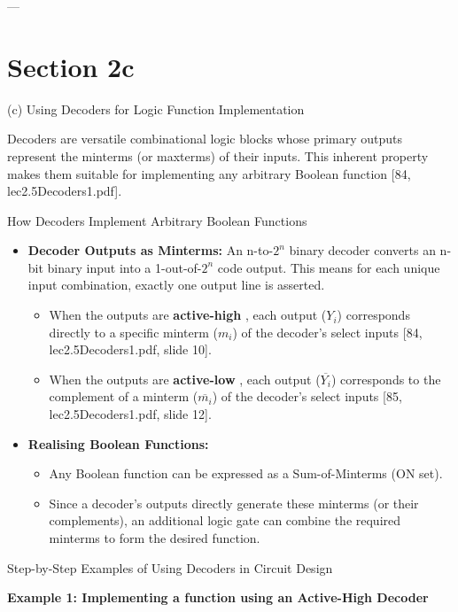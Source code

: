 \documentclass{article}
\begin{document}
---

\section{Section 2c}

(c) Using Decoders for Logic Function Implementation

Decoders are versatile combinational logic blocks whose primary outputs represent the minterms (or maxterms) of their inputs. This inherent property makes them suitable for implementing any arbitrary Boolean function [84, lec2.5Decoders1.pdf].

How Decoders Implement Arbitrary Boolean Functions

\begin{itemize}
    \item \textbf{Decoder Outputs as Minterms:} An n-to-$2^n$ binary decoder converts an n-bit binary input into a 1-out-of-$2^n$ code output. This means for each unique input combination, exactly one output line is asserted.

        \begin{itemize}
            \item When the outputs are \textbf{active-high} , each output ($Y_i$) corresponds directly to a specific minterm ($m_i$) of the decoder's select inputs [84, lec2.5Decoders1.pdf, slide 10].
            \item When the outputs are \textbf{active-low} , each output ($\overline{Y_i}$) corresponds to the complement of a minterm ($\overline{m_i}$) of the decoder's select inputs [85, lec2.5Decoders1.pdf, slide 12].
        \end{itemize}

    \item \textbf{Realising Boolean Functions:}

        \begin{itemize}
            \item Any Boolean function can be expressed as a Sum-of-Minterms (ON set).
            \item Since a decoder's outputs directly generate these minterms (or their complements), an additional logic gate can combine the required minterms to form the desired function.
        \end{itemize}
\end{itemize}

Step-by-Step Examples of Using Decoders in Circuit Design

\textbf{Example 1: Implementing a function using an Active-High Decoder}
\end{document}

